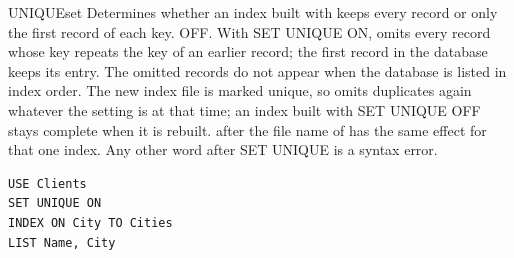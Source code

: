 \begin{XbaseEntry}{UNIQUE}{set}
Determines whether an index built with  keeps every record or only
the first record of each key.
\Syntax
{}
\Defaults
OFF.
\Usage
With SET UNIQUE ON,  omits every record whose key repeats the key
of an earlier record; the first record in the database keeps its entry.  The
omitted records do not appear when the database is listed in index order.
The new index file is marked unique, so  omits duplicates again
whatever the setting is at that time; an index built with SET UNIQUE OFF
stays complete when it is rebuilt.   after the file name of
 has the same effect for that one index.  Any other word after SET
UNIQUE is a syntax error.
\Examples
\begin{verbatim}
USE Clients
SET UNIQUE ON
INDEX ON City TO Cities
LIST Name, City
\end{verbatim}
\end{XbaseEntry}

